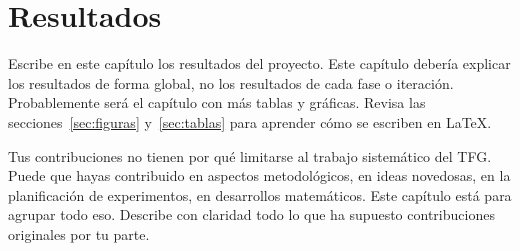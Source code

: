 \chapter{Resultados}
\label{ch:resultados}

Escribe en este capítulo los resultados del proyecto.  Este capítulo debería explicar los resultados de forma global, no los resultados de cada fase o iteración.  Probablemente será el capítulo con más tablas y gráficas.  Revisa las secciones~\ref{sec:figuras} y~\ref{sec:tablas} para aprender cómo se escriben en \LaTeX{}.

Tus contribuciones no tienen por qué limitarse al trabajo sistemático del TFG.  Puede que hayas contribuido en aspectos metodológicos, en ideas novedosas, en la planificación de experimentos, en desarrollos matemáticos. Este capítulo está para agrupar todo eso.  Describe con claridad todo lo que ha supuesto contribuciones originales por tu parte.

